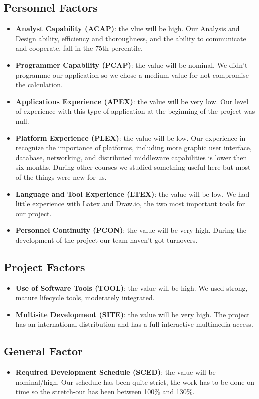 \subsection{Personnel Factors}
\begin{itemize}
    \item \textbf{Analyst Capability (ACAP)}: the vlue will be high. Our Analysis and Design ability, efficiency and thoroughness, and the ability to communicate and cooperate, fall in the 75th percentile.
    \item \textbf{Programmer Capability (PCAP)}: the value will be nominal. We didn't programme our application so we chose a medium value for not compromise the calculation.
    \item \textbf{Applications Experience (APEX)}: the value will be very low. Our level of experience with this type of application at the beginning of the project was null.
    \item \textbf{Platform Experience (PLEX)}: the value will be low. Our experience in recognize the importance of platforms, including more graphic user interface, database, networking, and distributed middleware capabilities is lower then six months. During other courses we studied something useful here but most of the things were new for us.
    \item \textbf{Language and Tool Experience (LTEX)}: the value will be low. We had little experience with Latex and Draw.io, the two most important tools for our project.
    \item \textbf{Personnel Continuity (PCON)}: the value will be very high. During the development of the project our team haven't got turnovers.
\end{itemize}

\subsection{Project Factors}
\begin{itemize}
    \item \textbf{Use of Software Tools (TOOL)}: the value will be high. We used strong, mature lifecycle tools, moderately integrated. 
    \item \textbf{Multisite Development (SITE)}: the value will be very high. The project has an international distribution and has a full interactive multimedia access.
\end{itemize}

\subsection{General Factor}
\begin{itemize}
    \item \textbf{Required Development Schedule (SCED)}: the value will be nominal/high. Our schedule has been quite strict, the work has to be done on time so the stretch-out has been between 100\% and 130\%. 
\end{itemize}

